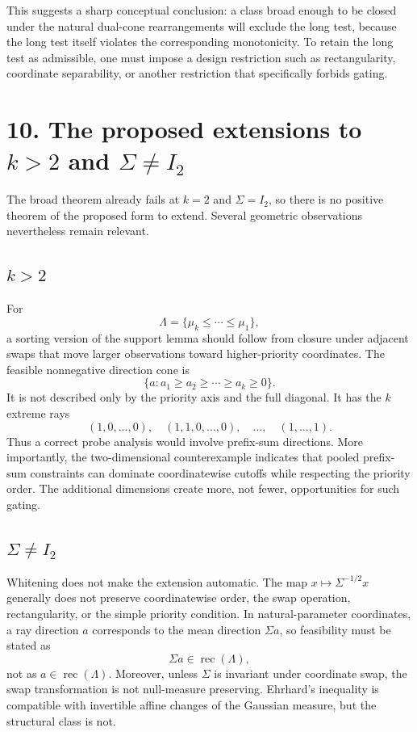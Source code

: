 \documentclass[12pt]{article}
\theoremstyle{definition}
\theoremstyle{remark}
\begin{document}
This suggests a sharp conceptual conclusion: a class broad enough to be closed under the natural dual-cone rearrangements will exclude the long test, because the long test itself violates the corresponding monotonicity.  To retain the long test as admissible, one must impose a design restriction such as rectangularity, coordinate separability, or another restriction that specifically forbids gating.

\section*{10. The proposed extensions to $k>2$ and $\Sigma\ne I_2$}

The broad theorem already fails at $k=2$ and $\Sigma=I_2$, so there is no positive theorem of the proposed form to extend.  Several geometric observations nevertheless remain relevant.

\subsection*{$k>2$}

For
\[
\Lambda=\{\mu_k\le\cdots\le\mu_1\},
\]
a sorting version of the support lemma should follow from closure under adjacent swaps that move larger observations toward higher-priority coordinates.  The feasible nonnegative direction cone is
\[
\{a:a_1\ge a_2\ge\cdots\ge a_k\ge0\}.
\]
It is not described only by the priority axis and the full diagonal.  It has the $k$ extreme rays
\[
(1,0,\ldots,0),
\quad
(1,1,0,\ldots,0),
\quad\ldots,\quad
(1,\ldots,1).
\]
Thus a correct probe analysis would involve prefix-sum directions.  More importantly, the two-dimensional counterexample indicates that pooled prefix-sum constraints can dominate coordinatewise cutoffs while respecting the priority order.  The additional dimensions create more, not fewer, opportunities for such gating.

\subsection*{$\Sigma\ne I_2$}

Whitening does not make the extension automatic.  The map $x\mapsto\Sigma^{-1/2}x$ generally does not preserve coordinatewise order, the swap operation, rectangularity, or the simple priority condition.  In natural-parameter coordinates, a ray direction $a$ corresponds to the mean direction $\Sigma a$, so feasibility must be stated as
\[
\Sigma a\in\operatorname{rec}(\Lambda),
\]
not as $a\in\operatorname{rec}(\Lambda)$.  Moreover, unless $\Sigma$ is invariant under coordinate swap, the swap transformation is not null-measure preserving.  Ehrhard's inequality is compatible with invertible affine changes of the Gaussian measure, but the structural class is not.
\end{document}
